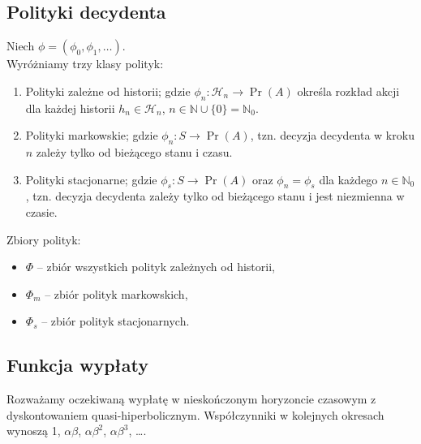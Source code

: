 \subsection{Polityki decydenta}
Niech $\phi = (\phi_0, \phi_1, \ldots)$.\\ 
Wyróżniamy trzy klasy polityk:
\begin{enumerate}
\item Polityki zależne od historii; gdzie $\phi_n : \mathcal{H}_n \rightarrow \Pr(A)$ określa rozkład akcji dla każdej historii $h_n \in \mathcal{H}_n$, $n \in \mathbb{N} \cup \{0\} = \mathbb{N}_0$.
\item Polityki markowskie; gdzie $\phi_n : S \rightarrow \Pr(A)$, tzn. decyzja decydenta w kroku $n$ zależy tylko od bieżącego stanu i czasu.
\item Polityki stacjonarne; gdzie $\phi_s : S \rightarrow \Pr(A)$ oraz $\phi_n = \phi_s$ dla każdego $n \in \mathbb{N}_0$, tzn. decyzja decydenta zależy tylko od bieżącego stanu i jest niezmienna w czasie.
\end{enumerate}

Zbiory polityk:
\begin{itemize}
\item $\Phi$ -- zbiór wszystkich polityk zależnych od historii,
\item $\Phi_m$ -- zbiór polityk markowskich,
\item $\Phi_s$ -- zbiór polityk stacjonarnych.
\end{itemize}

\subsection{Funkcja wypłaty}

Rozważamy oczekiwaną wypłatę w nieskończonym horyzoncie czasowym z dyskontowaniem quasi-hiperbolicznym. Współczynniki w kolejnych okresach wynoszą 1, $\alpha \beta$, $\alpha \beta^2$, $\alpha \beta^3$, \ldots.

